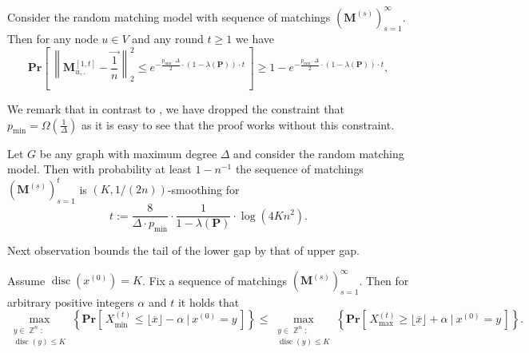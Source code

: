 \documentclass[twoside,leqno]{article}
\DeclareMathOperator{\Z}{\mathbb{Z}}
\newcommand{\Pro}[1]{\mathbf{Pr} \left[\,#1\,\right]}
\newcommand{\M}{\mathbf{M}}
\renewcommand{\P}{\mathbf{P}}
\DeclareMathOperator{\discr}{\mathrm{disc}}
\DeclareMathOperator{\1}{\mathbf{1}}
\numberwithin{equation}{section}
\begin{document}
\begin{lemma}\label{cor:prob:randomMatcing}
Consider the random matching model with sequence of matchings $\left(\M^{(s)}\right)_{s=1}^{\infty}$. Then for any node $u\in V$ and any round $t \geq 1$ we have
\[
\Pro{ \left\| \M_{u,.}^{[1,t]} -\vec{ \frac{1}{n}} \right\|_2^2 \le e^{-\frac{p_{\min}\cdot \Delta}{2}\cdot (1-\lambda(\P))\cdot t}} \ge 1-e^{-\frac{p_{\min}\cdot \Delta}{2}\cdot (1-\lambda(\P))\cdot t},
\]
\end{lemma}
We remark that in contrast to \cite[Corollary 2.7]{DBLP:conf/focs/SauerwaldS12}, we have dropped the constraint that $p_{\min}=\Omega(\frac{1}{\Delta})$ as it is easy to see that the proof works without this constraint.
\begin{theorem}\label{tauCount:RM}
Let $G$ be any graph with maximum degree $\Delta$ and consider the random matching model. Then with probability at least $1-n^{-1}$ the sequence of matchings $\left(\M^{(s)}\right)_{s=1}^t$ is $(K,1/(2n))$-smoothing for
\[
t:= \frac{8}{\Delta\cdot p_{\min}} \cdot \frac{1}{1-\lambda(\P)}\cdot \log\left(4Kn^2\right).
\]

\end{theorem}







Next observation bounds the tail of the lower gap by that of upper gap.
\begin{observation}
\label{obs:upLowDiscRelation} 
Assume
$\discr(x^{(0)})=K$.
Fix a sequence of matchings $\left(\M^{(s)}\right)_{s=1}^{\infty}$.
Then for arbitrary positive integers $\alpha$ and $t$ it holds that
\[\max_{\substack{y\in \Z^n:\\ \discr(y)\le K}}\left\{\Pro{X_{\min}^{(t)} \le \lfloor \overline{x} \rfloor - \alpha ~\Big|~ x^{(0)}=y}\right\} \le \max_{\substack{y\in \Z^n:\\ \discr(y)\le K}}\left\{\Pro{X_{\max}^{(t)} \ge \lfloor \overline{x} \rfloor + \alpha ~\Big|~ x^{(0)}=y}\right\}. \]
\end{observation}
\end{document}
